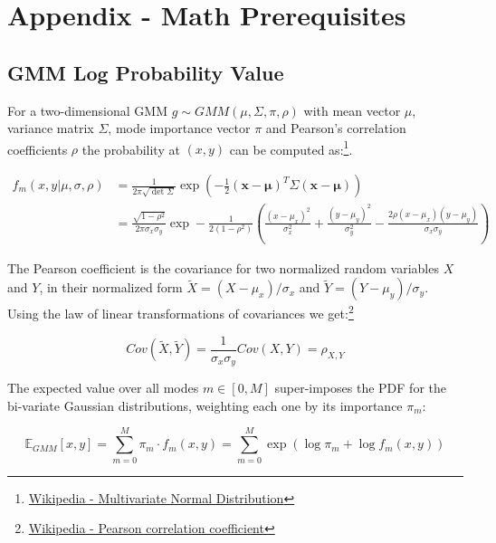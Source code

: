 \chapter{Appendix - Math Prerequisites}

\section{GMM Log Probability Value}
\label{appendix:gmm_log_prob}
For a two-dimensional \ac{GMM} $g \sim GMM(\mu, \Sigma, \pi, \rho)$ with mean vector $\mu$, variance matrix $\Sigma$, mode importance vector $\pi$ and Pearson's correlation coefficients $\rho$ the probability at $(x, y)$ can be computed as:\footnote{\href{https://de.wikipedia.org/wiki/Mehrdimensionale_Normalverteilung}{Wikipedia - Multivariate Normal Distribution}}.

\begin{align}
f_m(x, y | \mu, \sigma, \rho) 
&= \frac{1}{2 \pi \sqrt{\det \Sigma}} \exp \left(- \frac{1}{2} (\boldsymbol{x} - \boldsymbol{\mu})^T \Sigma (\boldsymbol{x} - \boldsymbol{\mu}) \right) \\
&= {\frac{\sqrt{1- \rho^2}}{2 \pi \sigma_x \sigma_y} 
\exp - \frac{1}{2 (1 - \rho^2)}} \left( \frac{( x - \mu _x)^2}{\sigma_x^2} +
\frac {(y - \mu_y)^2}{\sigma_y^2}-{\frac {2\rho (x - \mu_x)(y - \mu_y)}
{\sigma_x \sigma_y}} \right)	
\end{align}

The Pearson coefficient is the covariance for two normalized random variables $X$ and $Y$, in their normalized form $\tilde{X} = (X - \mu_x)/\sigma_x$ and $\tilde{Y} = (Y - \mu_y) / \sigma_y$. Using the law of linear transformations of covariances we get:\footnote{\href{https://en.wikipedia.org/wiki/Pearson_correlation_coefficient}{Wikipedia - Pearson correlation coefficient}} 

\begin{equation}
Cov(\tilde{X}, \tilde{Y}) = \frac{1}{\sigma_x \sigma_y} Cov(X, Y) = \rho_{X, Y}
\end{equation}

The expected value over all modes $m \in [0, M]$ super-imposes the \ac{PDF} for the bi-variate Gaussian distributions, weighting each one by its importance $\pi_m$:

\begin{equation}
\mathbb{E}_{GMM}[x, y] = \sum_{m=0}^M \pi_m \cdot f_m(x, y) =  \sum_{m=0}^M \exp \left( \log \pi_m + \log f_m(x, y) \right)	
\end{equation}


